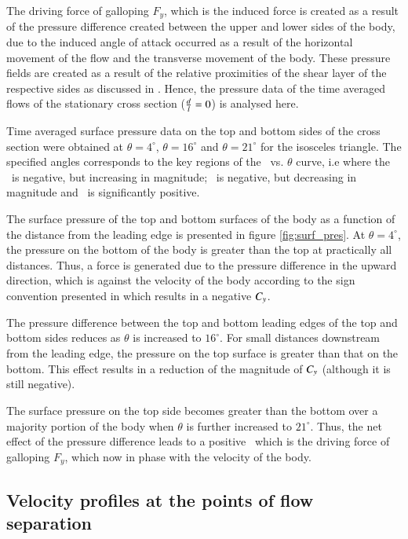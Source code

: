 The driving force of galloping $F_y$, which is the induced force is created as a result of the pressure difference created  between the upper and lower sides of the body, due to the induced angle of attack occurred as a result of the horizontal movement of the flow and the transverse movement of the body. These pressure fields are created as a result of the relative proximities of the shear layer of the respective sides as discussed in . Hence, the pressure data of the time averaged flows of the stationary cross section ($\frac{d}{l}=0$) is analysed here. 


Time averaged surface pressure data on the top and bottom sides of the cross section were obtained at $\theta=4^{\circ}$, $\theta=16^{\circ}$ and $\theta=21^{\circ}$ for the isosceles triangle. The specified angles corresponds to the key regions of the \cy\ vs. $\theta$ curve, i.e where the \cy\ is negative, but increasing in magnitude; \cy\ is negative, but decreasing in magnitude and \cy\ is significantly positive.



The surface pressure of the top and bottom surfaces of the body as a function of the distance from the leading edge is presented in figure \ref{fig:surf_pres}. At $\theta=4^{\circ}$, the pressure on the bottom of the body is greater than the top at practically all distances. Thus, a force is generated due to the pressure difference in the upward direction, which is against the velocity of the body according to the sign convention presented in  which results in a negative $C_{y}$.

The pressure difference between the top and bottom leading edges of the top and bottom sides reduces as $\theta$ is increased to $16^{\circ}$. For small distances downstream from the leading edge, the pressure on the top surface is greater than that on the bottom. This effect results in a reduction of the magnitude of $C_{y}$ (although it is still negative).

The surface pressure on the top side becomes greater than the bottom over a majority portion of the body when $\theta$ is further increased to $21^{\circ}$. Thus, the net effect of the pressure difference leads to a positive \cy\ which is the driving force of galloping $F_y$, which now in phase with the velocity of the body.


\subsection{Velocity profiles at the points of flow separation}

